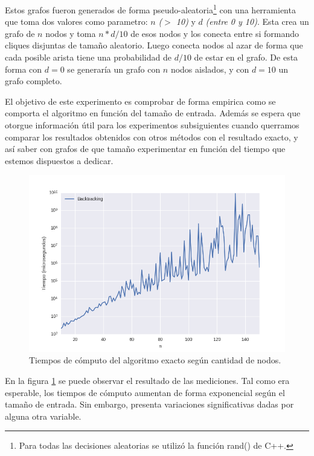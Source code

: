 Estos grafos fueron generados de forma pseudo-aleatoria\footnote{ Para todas las decisiones aleatorias se utilizó la función rand() de C++.} con una herramienta que toma dos valores como parametro: $n$ \textit{($>$ 10)} y $d$ \textit{(entre 0 y 10)}. Esta crea un grafo de $n$ nodos y toma $n*d/10$ de esos nodos y los conecta entre si formando cliques disjuntas de tamaño aleatorio. Luego conecta nodos al azar de forma que cada posible arista tiene una probabilidad de $d/10$ de estar en el grafo. De esta forma con $d=0$ se generaría un grafo con $n$ nodos aislados, y con $d=10$ un grafo completo.

El objetivo de este experimento es comprobar de forma empirica como se comporta el algoritmo en función del tamaño de entrada. Además se espera que otorgue información útil para los experimentos subsiguientes cuando querramos comparar los resultados obtenidos con otros métodos con el resultado exacto, y así saber con grafos de que tamaño experimentar en función del tiempo que estemos dispuestos a dedicar.

\begin{figure}[h]
	\centering
		\includegraphics[scale=0.6]{Imagenes/Tiempos150nlogy.png}
		\caption{\small{Tiempos de cómputo del algoritmo exacto según cantidad de nodos.}}
        \label{backtrackingN}
\end{figure}

En la figura \ref{backtrackingN} se puede observar el resultado de las mediciones. Tal como era esperable, los tiempos de cómputo aumentan de forma exponencial según el tamaño de entrada. Sin embargo, presenta variaciones significativas dadas por alguna otra variable. 

